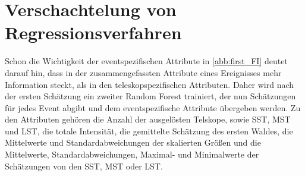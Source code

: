 
\section{Verschachtelung von Regressionsverfahren}

Schon die Wichtigkeit der eventspezifischen Attribute in \autoref{abb:first_FI} deutet darauf hin, dass in der zusammengefassten Attribute eines Ereignisses
mehr Information steckt, als in den teleskopspezifischen Attributen.
Daher wird nach der ersten Schätzung ein zweiter Random Forest trainiert, der nun Schätzungen für jedes Event abgibt und dem eventspezifische Attribute
übergeben werden.
Zu den Attributen gehören die Anzahl der ausgelösten Telskope, sowie SST, MST und LST, die totale Intensität, die gemittelte Schätzung des ersten Waldes,
die Mittelwerte und Standardabweichungen der skalierten Größen und die Mittelwerte, Standardabweichungen, Maximal- und Minimalwerte der Schätzungen von den
SST, MST oder LST.

